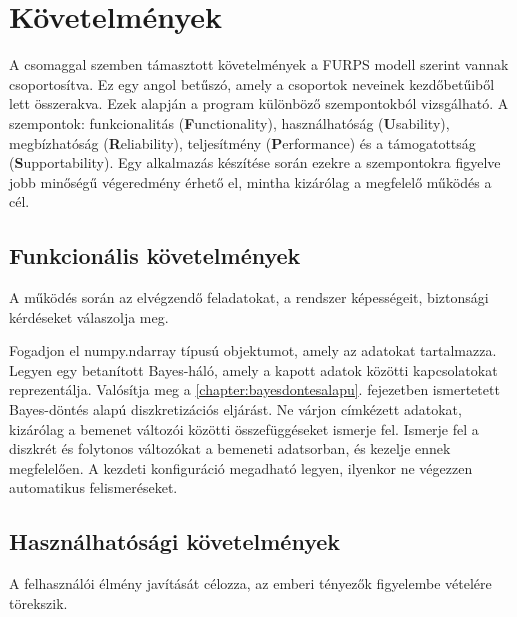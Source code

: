\section{Követelmények}
A csomaggal szemben támasztott követelmények a FURPS modell \cite{grady1992practical} szerint vannak csoportosítva. Ez egy angol betűszó, amely a csoportok neveinek kezdőbetűiből lett összerakva. Ezek alapján a program különböző szempontokból vizsgálható. A szempontok: funkcionalitás (\textbf{F}unctionality), használhatóság (\textbf{U}sability), megbízhatóság (\textbf{R}eliability), teljesítmény (\textbf{P}erformance) és a támogatottság (\textbf{S}upportability). Egy alkalmazás készítése során ezekre a szempontokra figyelve jobb minőségű végeredmény érhető el, mintha kizárólag a megfelelő működés a cél.

\subsection{Funkcionális követelmények}
A működés során az elvégzendő feladatokat, a rendszer képességeit, biztonsági kérdéseket válaszolja meg.

\begin{enumerate}
     Fogadjon el numpy.ndarray típusú objektumot, amely az adatokat tartalmazza.
     Legyen egy betanított Bayes-háló, amely a kapott adatok közötti kapcsolatokat reprezentálja.
     Valósítja meg a \autoref{chapter:bayesdontesalapu}. fejezetben ismertetett Bayes-döntés alapú diszkretizációs eljárást.
     Ne várjon címkézett adatokat, kizárólag a bemenet változói közötti összefüggéseket ismerje fel.
     Ismerje fel a diszkrét és folytonos változókat a bemeneti adatsorban, és kezelje ennek megfelelően.
     A kezdeti konfiguráció megadható legyen, ilyenkor ne végezzen automatikus felismeréseket.
\end{enumerate}

\subsection{Használhatósági követelmények}
A felhasználói élmény javítását célozza, az emberi tényezők figyelembe vételére törekszik.

